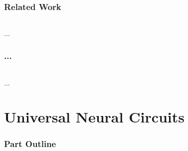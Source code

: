 \documentclass{article}
\begin{document}
\section{Related Work}

\paragraph{}...

\section{...}

\paragraph{}...


\part{Universal Neural Circuits} %

\section*{Part Outline}
\end{document}
